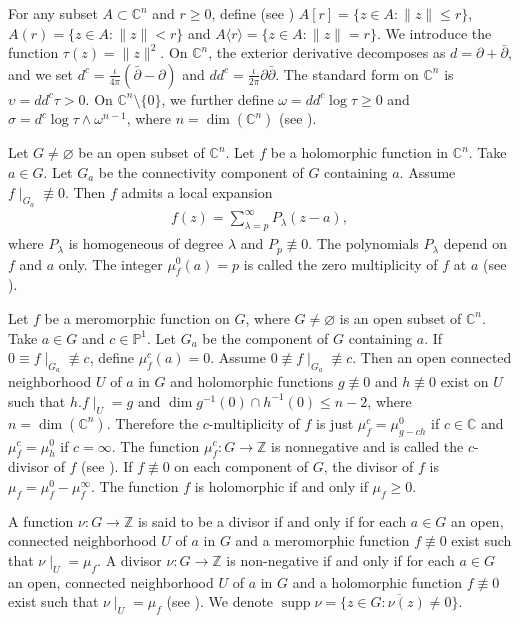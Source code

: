 \documentclass[11pt,reqno]{amsart}
\numberwithin{equation}{section}
\begin{document}
\smallskip
For any subset $A\subset \mathbb{C}^n$ and $r\ge0$, define (see \cite[pp. 6]{Stoll-1974}) $A[r]=\{z\in A:\|z\|\le r\}$,
$A(r)=\{z\in A:\|z\|<r\}$ and $A\langle r\rangle=\{z\in A:\|z\|=r\}$.
We introduce the function $\tau(z)=\|z\|^2$.
On $\mathbb{C}^n$, the exterior derivative decomposes as $d=\partial+\bar{\partial}$, and we set
$d^c=\frac{\iota}{4\pi}(\bar{\partial}-\partial)$ and $dd^c=\frac{\iota}{2\pi}\partial\bar{\partial}$.
The standard  form on $\mathbb{C}^n$ is $\upsilon= dd^c \tau >0$.
On $\mathbb{C}^n\setminus\{0\}$, we further define
$\omega = dd^c \log \tau \ge 0$ and $\sigma = d^c\log\tau \wedge \omega^{n-1}$,
where $n=\dim(\mathbb{C}^n)$ (see \cite[pp. 6]{Stoll-1974}).


\smallskip
Let $G\neq \varnothing$ be an open subset of $\mathbb{C}^n$. Let $f$ be a holomorphic function in $\mathbb{C}^n$.
Take $a\in G$. Let $G_a$ be the connectivity component of $G$ containing $a$. Assume $f\mid_{G_a}\not\equiv 0$. Then $f$ admits a local expansion
\begin{align*}
f(z)=\sum_{\lambda=p}^{\infty}P_\lambda(z-a),
\end{align*}
where $P_\lambda$ is homogeneous of degree $\lambda$ and $P_p\not\equiv0$. The polynomials $P_{\lambda}$ depend on $f$ and $a$ only.
The integer $\mu_f^0(a)=p$ is called the zero multiplicity of $f$ at $a$ (see \cite[pp. 12]{Stoll-1974}).

\smallskip
Let $f$ be a meromorphic function on $G$, where $G\neq \varnothing$ is an open subset of $\mathbb{C}^n$.
Take $a\in G$ and $c\in\mathbb{P}^1$. Let $G_a$ be the component of $G$ containing $a$. If $0\equiv f\mid_{G_a}\not\equiv c$, define $\mu^c_f(a)=0$. Assume $0\not\equiv f\mid_{G_a}\not\equiv c$. Then an open connected neighborhood $U$ of $a$ in $G$ and holomorphic functions $g\not\equiv 0$ and $h\not\equiv 0$ exist on $U$ such that $h. f\mid_U=g$ and $\dim g^{-1}(0)\cap h^{-1}(0)\leq n-2$, where $n=\dim(\mathbb{C}^n)$. Therefore the $c$-multiplicity of $f$ is just $\mu^c_f=\mu^0_{g-ch}$ if $c\in\mathbb{C}$ and $\mu^c_f=\mu^0_h$ if $c=\infty$. The function $\mu^c_f:G\to \mathbb{Z}$ is nonnegative and is called the $c$-divisor of $f$ (see \cite[pp. 12]{Stoll-1974}).
If $f\not\equiv0$ on each component of $G$, the divisor of $f$ is $\mu_f=\mu_f^0-\mu_f^\infty$.
The function $f$ is holomorphic if and only if $\mu_f\ge0$.

\smallskip
A function $\nu:G\to \mathbb{Z}$ is said to be a divisor if and only if for each $a\in G$ an open, connected neighborhood $U$ of $a$ in $G$ and a meromorphic function $f\not\equiv 0$ exist such that $\nu\mid_{U}=\mu_f$. A divisor $\nu:G\to \mathbb{Z}$ is non-negative if and only if for each $a\in G$ an open, connected neighborhood $U$ of $a$ in $G$ and a holomorphic function $f\not\equiv 0$ exist such that $\nu\mid_{U}=\mu_f$ (see \cite[pp. 13]{Stoll-1974}).
We denote $\operatorname{supp}\nu=\overline{\{z\in G:\nu(z)\ne0\}}$.
\end{document}
